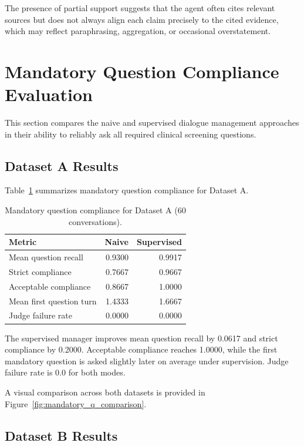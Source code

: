 The presence of partial support suggests that the agent often cites relevant sources but does not always align each claim precisely to the cited evidence, which may reflect paraphrasing, aggregation, or occasional overstatement.

\section{Mandatory Question Compliance Evaluation}

This section compares the naive and supervised dialogue management approaches in their ability to reliably ask all required clinical screening questions.

\subsection{Dataset A Results}

Table~\ref{tab:mandatory_q_dataset_a} summarizes mandatory question compliance for Dataset A.

\begin{table}[htbp]
	\centering
	\caption{Mandatory question compliance for Dataset A (60 conversations).}
	\label{tab:mandatory_q_dataset_a}
	\begin{tabular}{lrr}
		\toprule
		\textbf{Metric} & \textbf{Naive} & \textbf{Supervised} \\
		\midrule
		Mean question recall & 0.9300 & 0.9917 \\
		Strict compliance    & 0.7667 & 0.9667 \\
		Acceptable compliance & 0.8667 & 1.0000 \\
		Mean first question turn & 1.4333 & 1.6667 \\
		Judge failure rate   & 0.0000 & 0.0000 \\
		\bottomrule
	\end{tabular}
\end{table}

The supervised manager improves mean question recall by 0.0617 and strict compliance by 0.2000. 
Acceptable compliance reaches 1.0000, while the first mandatory question is asked slightly later on average under supervision. 
Judge failure rate is 0.0 for both modes.

A visual comparison across both datasets is provided in Figure~\ref{fig:mandatory_q_comparison}.

\subsection{Dataset B Results}

